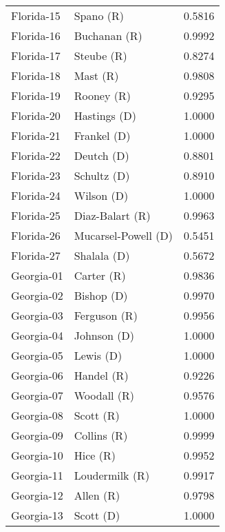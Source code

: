 \begin{longtable}{llr}
        Florida-15 &            Spano (R) &       0.5816 \\
        Florida-16 &         Buchanan (R) &       0.9992 \\
        Florida-17 &           Steube (R) &       0.8274 \\
        Florida-18 &             Mast (R) &       0.9808 \\
        Florida-19 &           Rooney (R) &       0.9295 \\
        Florida-20 &         Hastings (D) &       1.0000 \\
        Florida-21 &          Frankel (D) &       1.0000 \\
        Florida-22 &           Deutch (D) &       0.8801 \\
        Florida-23 &          Schultz (D) &       0.8910 \\
        Florida-24 &           Wilson (D) &       1.0000 \\
        Florida-25 &      Diaz-Balart (R) &       0.9963 \\
        Florida-26 &  Mucarsel-Powell (D) &       0.5451 \\
        Florida-27 &          Shalala (D) &       0.5672 \\
        Georgia-01 &           Carter (R) &       0.9836 \\
        Georgia-02 &           Bishop (D) &       0.9970 \\
        Georgia-03 &         Ferguson (R) &       0.9956 \\
        Georgia-04 &          Johnson (D) &       1.0000 \\
        Georgia-05 &            Lewis (D) &       1.0000 \\
        Georgia-06 &           Handel (R) &       0.9226 \\
        Georgia-07 &          Woodall (R) &       0.9576 \\
        Georgia-08 &            Scott (R) &       1.0000 \\
        Georgia-09 &          Collins (R) &       0.9999 \\
        Georgia-10 &             Hice (R) &       0.9952 \\
        Georgia-11 &       Loudermilk (R) &       0.9917 \\
        Georgia-12 &            Allen (R) &       0.9798 \\
        Georgia-13 &            Scott (D) &       1.0000 \\

\end{longtable}
